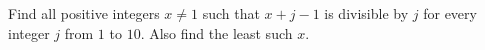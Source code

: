 Find all positive integers $x\ne 1$ such that $x+j-1$ is divisible by $j$ for every integer $j$ from $1$ to $10$. Also find the least such $x$.
